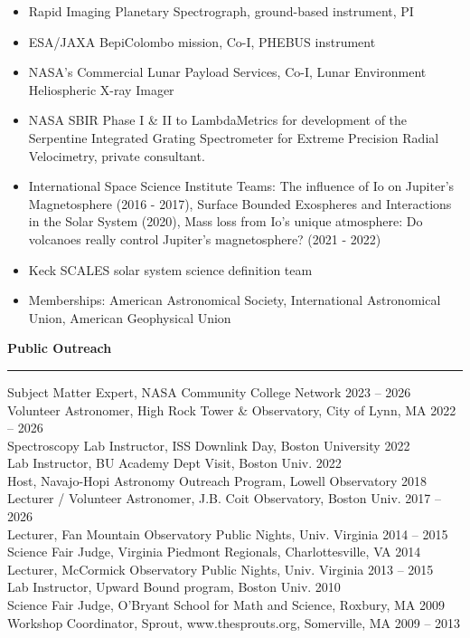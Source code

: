 \documentclass[12pt]{report}
\begin{document}
\begin{itemize} \itemsep -2pt %
	  \item Rapid Imaging Planetary Spectrograph, ground-based instrument, PI
	  \item ESA/JAXA BepiColombo mission, Co-I, PHEBUS instrument
	  \item NASA’s Commercial Lunar Payload Services, Co-I, Lunar Environment Heliospheric X-ray Imager
	  \item NASA SBIR Phase I \& II to LambdaMetrics for development of the Serpentine Integrated Grating Spectrometer for Extreme Precision
	Radial Velocimetry, private consultant.
	  \item International Space Science Institute Teams: The influence of Io on Jupiter's Magnetosphere (2016 - 2017), Surface Bounded Exospheres and Interactions in the Solar System (2020), Mass loss from Io’s unique atmosphere: Do volcanoes really control Jupiter’s magnetosphere? (2021 - 2022)
	  \item Keck SCALES solar system science definition team
	  \item Memberships: American Astronomical Society, International Astronomical Union, American Geophysical Union
\end{itemize}
\vspace{2 mm}

\noindent\bf{Public Outreach}\rm \hspace*{\fill} \\
\rule{\textwidth}{1pt}
\noindent Subject Matter Expert, NASA Community College Network \hfill 2023 –  2026\\
\noindent Volunteer Astronomer, High Rock Tower \& Observatory, City of Lynn, MA \hfill 2022 – 2026\\
\noindent Spectroscopy Lab Instructor, ISS Downlink Day, Boston University \hfill 2022\\
\noindent Lab Instructor, BU Academy Dept Visit, Boston Univ. \hfill 2022\\
\noindent Host, Navajo-Hopi Astronomy Outreach Program, Lowell Observatory \hfill 2018\\
\noindent Lecturer / Volunteer Astronomer, J.B. Coit Observatory, Boston Univ.	 \hfill 2017 –  2026\\
\noindent Lecturer, Fan Mountain Observatory Public Nights, Univ. Virginia \hfill 2014 – 2015\\
\noindent Science Fair Judge, Virginia Piedmont Regionals, Charlottesville, VA \hfill 2014\\
\noindent Lecturer, McCormick Observatory Public Nights, Univ. Virginia	 \hfill 2013 – 2015\\
\noindent Lab Instructor, Upward Bound program, Boston Univ. \hfill 2010\\
\noindent Science Fair Judge, O'Bryant School for Math and Science, Roxbury, MA \hfill 2009\\
\noindent Workshop Coordinator, Sprout, www.thesprouts.org, Somerville, MA \hfill 2009 – 2013\\
\end{document}

